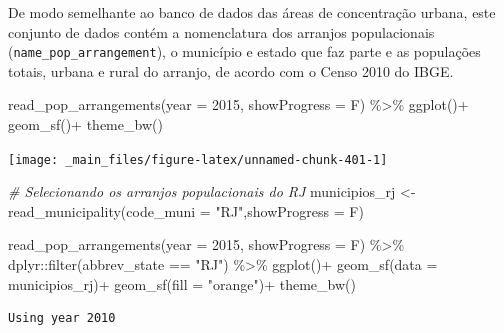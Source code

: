 \documentclass[
  brazilian,
]{book}
\newenvironment{Shaded}{\begin{snugshade}}{\end{snugshade}}
\newcommand{\AttributeTok}[1]{\textcolor[rgb]{0.77,0.63,0.00}{#1}}
\newcommand{\CommentTok}[1]{\textcolor[rgb]{0.56,0.35,0.01}{\textit{#1}}}
\newcommand{\DecValTok}[1]{\textcolor[rgb]{0.00,0.00,0.81}{#1}}
\newcommand{\FunctionTok}[1]{\textcolor[rgb]{0.00,0.00,0.00}{#1}}
\newcommand{\NormalTok}[1]{#1}
\newcommand{\OtherTok}[1]{\textcolor[rgb]{0.56,0.35,0.01}{#1}}
\newcommand{\SpecialCharTok}[1]{\textcolor[rgb]{0.00,0.00,0.00}{#1}}
\newcommand{\StringTok}[1]{\textcolor[rgb]{0.31,0.60,0.02}{#1}}
\begin{document}
De modo semelhante ao banco de dados das áreas de concentração urbana, este conjunto de dados contém a nomenclatura dos arranjos populacionais (\texttt{name\_pop\_arrangement}), o município e estado que faz parte e as populações totais, urbana e rural do arranjo, de acordo com o Censo 2010 do IBGE.

\begin{Shaded}
\begin{Highlighting}[]
\FunctionTok{read\_pop\_arrangements}\NormalTok{(}\AttributeTok{year =} \DecValTok{2015}\NormalTok{,}
                      \AttributeTok{showProgress =}\NormalTok{ F) }\SpecialCharTok{\%\textgreater{}\%}
  \FunctionTok{ggplot}\NormalTok{()}\SpecialCharTok{+}
  \FunctionTok{geom\_sf}\NormalTok{()}\SpecialCharTok{+}
  \FunctionTok{theme\_bw}\NormalTok{()}
\end{Highlighting}
\end{Shaded}

\begin{center}\texttt{[image: \_main\_files/figure-latex/unnamed-chunk-401-1]} \end{center}

\begin{Shaded}
\begin{Highlighting}[]
\CommentTok{\# Selecionando os arranjos populacionais do RJ}
\NormalTok{municipios\_rj }\OtherTok{\textless{}{-}} \FunctionTok{read\_municipality}\NormalTok{(}\AttributeTok{code\_muni =} \StringTok{"RJ"}\NormalTok{,}\AttributeTok{showProgress =}\NormalTok{ F)}

\FunctionTok{read\_pop\_arrangements}\NormalTok{(}\AttributeTok{year =} \DecValTok{2015}\NormalTok{,}
                      \AttributeTok{showProgress =}\NormalTok{ F) }\SpecialCharTok{\%\textgreater{}\%}
\NormalTok{  dplyr}\SpecialCharTok{::}\FunctionTok{filter}\NormalTok{(abbrev\_state }\SpecialCharTok{==} \StringTok{"RJ"}\NormalTok{) }\SpecialCharTok{\%\textgreater{}\%} 
  \FunctionTok{ggplot}\NormalTok{()}\SpecialCharTok{+}
  \FunctionTok{geom\_sf}\NormalTok{(}\AttributeTok{data =}\NormalTok{ municipios\_rj)}\SpecialCharTok{+}
  \FunctionTok{geom\_sf}\NormalTok{(}\AttributeTok{fill =} \StringTok{"orange"}\NormalTok{)}\SpecialCharTok{+}
  \FunctionTok{theme\_bw}\NormalTok{()}
\end{Highlighting}
\end{Shaded}

\begin{verbatim}
Using year 2010
\end{verbatim}
\end{document}
